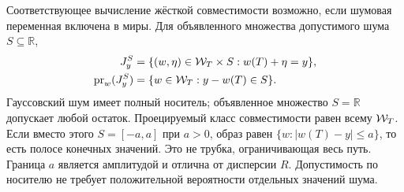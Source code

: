 {Соответствующее вычисление жёсткой совместимости возможно, если шумовая переменная включена в миры. Для объявленного множества допустимого шума $S\subseteq\mathbb R$,}
\begin{equation}\label{eq:noise-set}
\begin{aligned}
J_y^S&=\{(w,\eta)\in\mathcal W_T\times S:w(T)+\eta=y\},\\
\operatorname{pr}_w(J_y^S)&=\{w\in\mathcal W_T:y-w(T)\in S\}.
\end{aligned}
\end{equation}
{Гауссовский шум имеет полный носитель; объявленное множество $S=\mathbb R$ допускает любой остаток. Проецируемый класс совместимости равен всему $\mathcal W_T$. Если вместо этого $S=[-a,a]$ при $a>0$, образ равен $\{w:|w(T)-y|\le a\}$, то есть полосе конечных значений. Это не трубка, ограничивающая весь путь. Граница $a$ является амплитудой и отлична от дисперсии $R$. Допустимость по носителю не требует положительной вероятности отдельных значений шума.}

